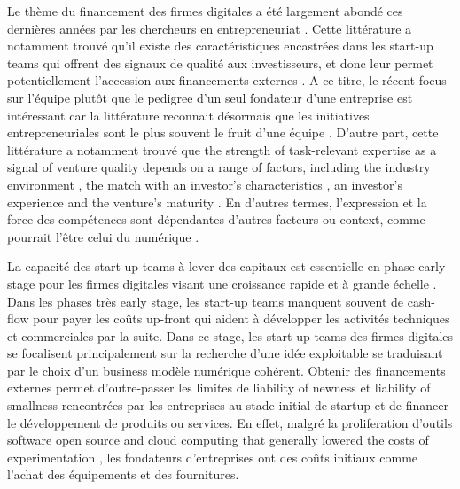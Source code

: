 \documentclass[12pt]{article}
\begin{document}
Le thème du financement des firmes digitales a été largement abondé ces dernières années par les chercheurs en entrepreneuriat \citep{klein2020start}. Cette littérature a notamment trouvé qu'il existe des caractéristiques encastrées dans les start-up teams qui offrent des signaux de qualité aux investisseurs, et donc leur permet potentiellement l'accession aux financements externes \citep{pinelli2020too, reese2020should}. A ce titre, le récent focus sur l'équipe plutôt que le pedigree d'un seul fondateur d'une entreprise est intéressant car la littérature reconnait désormais que les initiatives entrepreneuriales sont le plus souvent le fruit d'une équipe \citep{klotz2014new}. D'autre part, cette littérature a notamment trouvé que the strength of task-relevant expertise as a signal of venture quality depends on a range of factors, including the industry environment \citep{townsend2015turning}, the match with an investor’s characteristics \citep{aggarwal2015evaluating}, an investor’s experience \citep{franke2008venture} and the venture’s maturity \citep{hallen2008causes}. En d'autres termes, l'expression et la force des compétences sont dépendantes d'autres facteurs ou context, comme pourrait l'être celui du numérique \citep{nambisan2017digital}.

La capacité des start-up teams à lever des capitaux est essentielle en phase early stage pour les firmes digitales visant une croissance rapide et à grande échelle \citep{rosenbusch2013does}. Dans les phases très early stage, les start-up teams manquent souvent de cash-flow pour payer les coûts up-front qui aident à développer les activités techniques et commerciales par la suite. Dans ce stage, les start-up teams des firmes digitales se focalisent principalement sur la recherche d'une idée exploitable se traduisant par le choix d'un business modèle numérique cohérent. Obtenir des financements externes permet d'outre-passer les limites de liability of newness et liability of smallness rencontrées par les entreprises au stade initial de startup et de financer le développement de produits ou services. En effet, malgré la proliferation d'outils software open source and cloud computing that generally lowered the costs of experimentation \citep{nanda2016financing}, les fondateurs d'entreprises ont des coûts initiaux comme l'achat des équipements et des fournitures.
\end{document}
